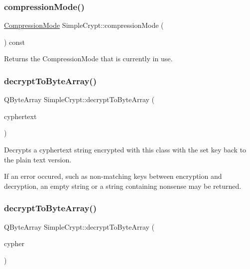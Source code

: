 \subsubsection{\texorpdfstring{compressionMode()}{compressionMode()}}
{\footnotesize\ttfamily \mbox{\hyperlink{class_simple_crypt_a25298e746f175cf175a18f082092ca8e}{Compression\+Mode}} Simple\+Crypt\+::compression\+Mode (\begin{DoxyParamCaption}{ }\end{DoxyParamCaption}) const\hspace{0.3cm}{\ttfamily [inline]}}

Returns the Compression\+Mode that is currently in use. \mbox{\label{class_simple_crypt_ad6785e087d449a1aa80c39248e98fcda}} 
\subsubsection{\texorpdfstring{decryptToByteArray()}{decryptToByteArray()}\hspace{0.1cm}{\footnotesize\ttfamily [1/2]}}
{\footnotesize\ttfamily Q\+Byte\+Array Simple\+Crypt\+::decrypt\+To\+Byte\+Array (\begin{DoxyParamCaption}\item[{const Q\+String \&}]{cyphertext }\end{DoxyParamCaption})}

Decrypts a cyphertext string encrypted with this class with the set key back to the plain text version.

If an error occured, such as non-\/matching keys between encryption and decryption, an empty string or a string containing nonsense may be returned. \mbox{\label{class_simple_crypt_a4babb69e45849f672574a26b6433c85a}} 
\subsubsection{\texorpdfstring{decryptToByteArray()}{decryptToByteArray()}\hspace{0.1cm}{\footnotesize\ttfamily [2/2]}}
{\footnotesize\ttfamily Q\+Byte\+Array Simple\+Crypt\+::decrypt\+To\+Byte\+Array (\begin{DoxyParamCaption}\item[{Q\+Byte\+Array}]{cypher }\end{DoxyParamCaption})}

